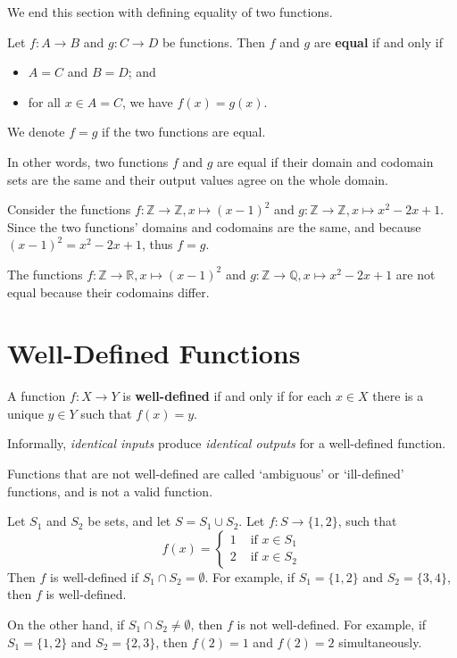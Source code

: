 We end this section with defining equality of two functions.
\begin{definition}
    Let $f: A \to B$ and $g: C \to D$ be functions. Then $f$ and $g$ are \textbf{equal} if and only if
    \begin{itemize}
        \item $A = C$ and $B = D$; and
        \item for all $x \in A = C$, we have $f(x) = g(x)$.
    \end{itemize}
    We denote $f = g$ if the two functions are equal.
\end{definition}
In other words, two functions $f$ and $g$ are equal if their domain and codomain sets are the same and their output values agree on the whole domain.
\begin{example}
    Consider the functions $f: \mathbb{Z} \to \mathbb{Z}, x \mapsto (x-1)^2$ and $g: \mathbb{Z} \to \mathbb{Z}, x \mapsto x^2 - 2x + 1$. Since the two functions' domains and codomains are the same, and because $(x-1)^2 = x^2 - 2x + 1$, thus $f = g$.
\end{example}
\begin{example}
    The functions $f: \mathbb{Z} \to \mathbb{R}, x \mapsto (x-1)^2$ and $g: \mathbb{Z} \to \mathbb{Q}, x \mapsto x^2 - 2x + 1$ are not equal because their codomains differ.
\end{example}

\section{Well-Defined Functions}
\begin{definition}
    A function $f: X \to Y$ is \textbf{well-defined} if and only if for each $x \in X$ there is a unique $y \in Y$ such that $f(x) = y$.
\end{definition}
Informally, \textit{identical inputs} produce \textit{identical outputs} for a well-defined function.
\begin{remark}
    Functions that are not well-defined are called `ambiguous' or `ill-defined' functions, and is not a valid function.
\end{remark}

\begin{example}
    Let $S_1$ and $S_2$ be sets, and let $S = S_1 \cup S_2$. Let $f: S \to \{1, 2\}$, such that
    \[
        f(x) = \begin{cases}
            1 & \textrm{ if } x \in S_1\\
            2 & \textrm{ if } x \in S_2
        \end{cases}
    \]
    Then $f$ is well-defined if $S_1 \cap S_2 = \emptyset$. For example, if $S_1 = \{1, 2\}$ and $S_2 = \{3, 4\}$, then $f$ is well-defined.
    
    On the other hand, if $S_1 \cap S_2 \neq \emptyset$, then $f$ is not well-defined. For example, if $S_1 = \{1, 2\}$ and $S_2 = \{2, 3\}$, then $f(2) = 1$ and $f(2) = 2$ simultaneously.
\end{example}

